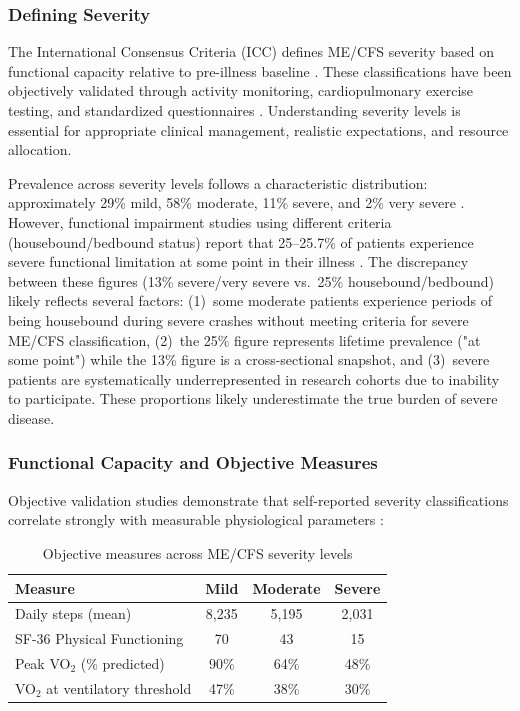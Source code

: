 
\subsubsection{Defining Severity}

The International Consensus Criteria (ICC) defines ME/CFS severity based on functional capacity relative to pre-illness baseline \cite{Carruthers2011ICC}. These classifications have been objectively validated through activity monitoring, cardiopulmonary exercise testing, and standardized questionnaires \cite{vanCampen2020severity}. Understanding severity levels is essential for appropriate clinical management, realistic expectations, and resource allocation.

Prevalence across severity levels follows a characteristic distribution: approximately 29\% mild, 58\% moderate, 11\% severe, and 2\% very severe \cite{Lacerda2019prevalence}. However, functional impairment studies using different criteria (housebound/bedbound status) report that 25--25.7\% of patients experience severe functional limitation at some point in their illness \cite{Pendergrast2020housebound,Montoya2021severe}. The discrepancy between these figures (13\% severe/very severe vs.\ 25\% housebound/bedbound) likely reflects several factors: (1)~some moderate patients experience periods of being housebound during severe crashes without meeting criteria for severe ME/CFS classification, (2)~the 25\% figure represents lifetime prevalence ("at some point") while the 13\% figure is a cross-sectional snapshot, and (3)~severe patients are systematically underrepresented in research cohorts due to inability to participate. These proportions likely underestimate the true burden of severe disease.

\subsubsection{Functional Capacity and Objective Measures}

Objective validation studies demonstrate that self-reported severity classifications correlate strongly with measurable physiological parameters \cite{vanCampen2020severity}:

\begin{table}[htbp]
\centering
\caption{Objective measures across ME/CFS severity levels}
\label{tab:severity-measures}
\begin{tabular}{lccc}
\toprule
\textbf{Measure} & \textbf{Mild} & \textbf{Moderate} & \textbf{Severe} \\
\midrule
Daily steps (mean) & 8,235 & 5,195 & 2,031 \\
SF-36 Physical Functioning & 70 & 43 & 15 \\
Peak VO$_2$ (\% predicted) & 90\% & 64\% & 48\% \\
VO$_2$ at ventilatory threshold & 47\% & 38\% & 30\% \\
\bottomrule
\end{tabular}
\end{table}

